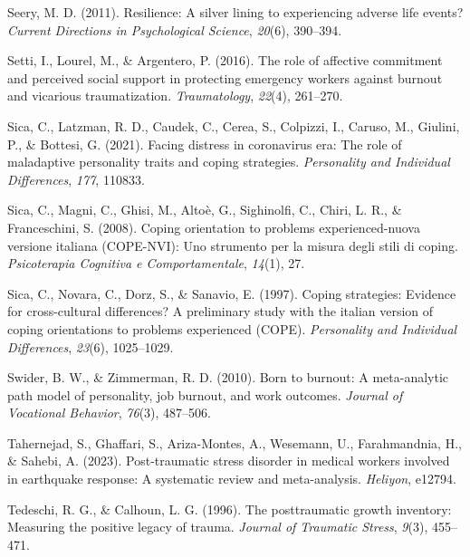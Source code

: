 \documentclass[
  man]{apa7}
\newlength{\cslhangindent}
\newlength{\cslentryspacingunit} %
\newenvironment{CSLReferences}[2] %
 {%
  \setlength{\parindent}{0pt}
  \ifodd #1
  \let\oldpar\par
  \def\par{\hangindent=\cslhangindent\oldpar}
  \fi
  \setlength{\parskip}{#2\cslentryspacingunit}
 }%
 {}
\begin{document}
\begin{CSLReferences}{1}{0}
\leavevmode{}%
Seery, M. D. (2011). Resilience: A silver lining to experiencing adverse life events? \emph{Current Directions in Psychological Science}, \emph{20}(6), 390--394.

\leavevmode{}%
Setti, I., Lourel, M., \& Argentero, P. (2016). The role of affective commitment and perceived social support in protecting emergency workers against burnout and vicarious traumatization. \emph{Traumatology}, \emph{22}(4), 261--270.

\leavevmode{}%
Sica, C., Latzman, R. D., Caudek, C., Cerea, S., Colpizzi, I., Caruso, M., Giulini, P., \& Bottesi, G. (2021). Facing distress in coronavirus era: The role of maladaptive personality traits and coping strategies. \emph{Personality and Individual Differences}, \emph{177}, 110833.

\leavevmode{}%
Sica, C., Magni, C., Ghisi, M., Altoè, G., Sighinolfi, C., Chiri, L. R., \& Franceschini, S. (2008). Coping orientation to problems experienced-nuova versione italiana (COPE-NVI): Uno strumento per la misura degli stili di coping. \emph{Psicoterapia Cognitiva e Comportamentale}, \emph{14}(1), 27.

\leavevmode{}%
Sica, C., Novara, C., Dorz, S., \& Sanavio, E. (1997). Coping strategies: Evidence for cross-cultural differences? A preliminary study with the italian version of coping orientations to problems experienced (COPE). \emph{Personality and Individual Differences}, \emph{23}(6), 1025--1029.

\leavevmode{}%
Swider, B. W., \& Zimmerman, R. D. (2010). Born to burnout: A meta-analytic path model of personality, job burnout, and work outcomes. \emph{Journal of Vocational Behavior}, \emph{76}(3), 487--506.

\leavevmode{}%
Tahernejad, S., Ghaffari, S., Ariza-Montes, A., Wesemann, U., Farahmandnia, H., \& Sahebi, A. (2023). Post-traumatic stress disorder in medical workers involved in earthquake response: A systematic review and meta-analysis. \emph{Heliyon}, e12794.

\leavevmode{}%
Tedeschi, R. G., \& Calhoun, L. G. (1996). The posttraumatic growth inventory: Measuring the positive legacy of trauma. \emph{Journal of Traumatic Stress}, \emph{9}(3), 455--471.


\end{CSLReferences}
\end{document}
